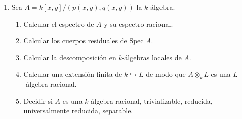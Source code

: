 \begin{enumerate}
    \item Sea $A=k[x,y]/(p(x,y), q(x, y))$ la $k$-álgebra.
    \begin{enumerate}
        \item[a)] Calcular el espectro de $A$ y su espectro racional.
        \item[b)] Calcular los cuerpos residuales de $\text{Spec } A$.
        \item[c)] Calcular la descomposición en $k$-álgebras locales de $A$.
        \item[d)] Calcular una extensión finita de $k \hookrightarrow L$ de modo que $A\otimes_{k}L$ es una $L$-álgebra racional.
        \item[d)] Decidir si $A$ es una $k$-álgebra racional, trivializable, reducida, universalmente reducida, separable.
    \end{enumerate}
\end{enumerate}
